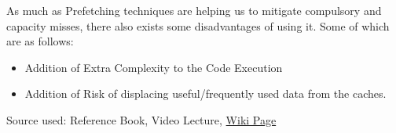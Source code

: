 \documentclass[12pt]{article}
\begin{document}
As much as Prefetching techniques are helping us to mitigate compulsory and capacity misses, there also exists some disadvantages of using it. Some of which are as follows: 
\begin{itemize}
    \item Addition of Extra Complexity to the Code Execution
    \item Addition of Risk of displacing useful/frequently used data from the caches.
\end{itemize}
Source used: Reference Book, Video Lecture,  \href{https://en.wikipedia.org/wiki/Cache_prefetching}{Wiki Page}
\end{document}
